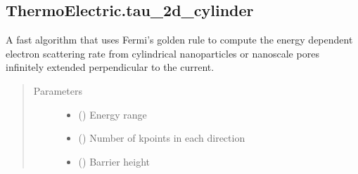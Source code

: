 \documentclass[letterpaper,10pt,english]{sphinxmanual}
\begin{document}
\subsection{ThermoElectric.tau\_2d\_cylinder}
\label{\detokenize{autosummary/ThermoElectric.tau_2d_cylinder:thermoelectric-tau-2d-cylinder}}\label{\detokenize{autosummary/ThermoElectric.tau_2d_cylinder::doc}}

\begin{fulllineitems}
\label{\detokenize{autosummary/ThermoElectric.tau_2d_cylinder:ThermoElectric.tau_2d_cylinder}}
\sphinxAtStartPar
A fast algorithm that uses Fermi’s golden rule to compute the energy dependent electron scattering rate
from cylindrical nano\sphinxhyphen{}particles or nano\sphinxhyphen{}scale pores infinitely extended perpendicular to the current.
\begin{quote}\begin{description}
\item[{Parameters}] \leavevmode\begin{itemize}
\item {} 
\sphinxAtStartPar
{} () \textendash{} Energy range

\item {} 
\sphinxAtStartPar
{} () \textendash{} Number of kpoints in each direction

\item {} 
\sphinxAtStartPar
{} () \textendash{} Barrier height


\end{itemize}
\end{description}
\end{quote}
\end{fulllineitems}
\end{document}
